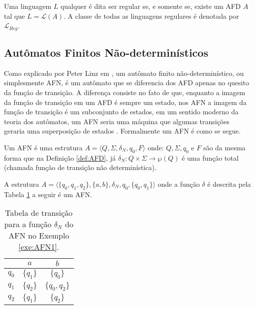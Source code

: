 \begin{definition}\label{def:LinguagensRegulares}
	Uma linguagem $L$ qualquer é dita ser regular se, e somente se, existe um AFD $A$ tal que $L = \mathcal{L}(A)$. A classe de todas as linguagens regulares é denotada por $\mathcal{L}_{Reg}$.
\end{definition}

\subsection{Autômatos Finitos Não-determinísticos}\label{subsec:AFN}

Como explicado por Peter Linz em \cite{linz2006}, um autômato finito não-determinístico, ou simplesmente AFN, é um autômato que se diferencia dos AFD apenas no quesito da função de transição. A diferença consiste no fato de que, enquanto a imagem da função de transição em um AFD é sempre um estado, nos AFN a imagem da  função de transição é um subconjunto de estados, em um sentido moderno da teoria dos autômatos, um AFN seria uma máquina que algumas transições geraria uma superposição de estados \cite{valdi2020phd}. Formalmente um AFN é como se segue.

\begin{definition}\label{def:AFN}
	Um AFN é uma estrutura $A = \langle Q, \Sigma, \delta_N, q_0, F\rangle$ onde: $Q, \Sigma, q_0$ e $F$ são da mesma forma que na Definição \ref{def:AFD}, já $\delta_N : Q \times \Sigma \rightarrow \wp(Q)$ é uma função total (chamada função de transição não determinística).
\end{definition}

\begin{exem}\label{exe:AFN1}
	A estrutura $A = \langle \{q_0, q_1, q_2\}, \{a, b\}, \delta_N, q_0, \{q_0, q_1\}  \rangle$ onde a função $\delta$ é descrita pela Tabela \ref{tab:DeltaAFN1} a seguir é um AFN.
	
	\begin{table}[h]
		\centering
		\begin{tabular}{c|cc}
			 \backslashbox{$Q$}{$\Sigma$}	& $a$ & $b$\\ \hline
			 $q_0$  & $\{q_1\}$ & $\{q_0\}$\\
			 $q_1$  & $\{q_2\}$ & $\{q_0, q_2\}$\\
			 $q_2$  & $\{q_1\}$ & $\{q_2\}$\\
		\end{tabular}
		\caption{Tabela de transição para a função $\delta_N$ do AFN no Exemplo \ref{exe:AFN1}.}
		\label{tab:DeltaAFN1}
	\end{table}
\end{exem}

